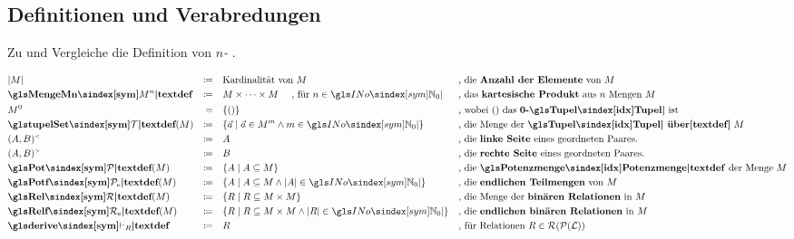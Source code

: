 \subsection{Definitionen und Verabredungen}%
\label{sub:Verabredungen}

Zu \chrqt{\symlen} und \chrqt{\symSet} Vergleiche die Definition von \emph{$n$-\Tupel} .

\begin{align}
	& |M|                          & \defeq \quad & \text{Kardinalität von } M
	&&\text{, die \defn{Anzahl der Elemente} von } M
	\label{def:Anzahl}                \\
	& \definition{\symMengeMn}     & \defeq \quad & M \times \dots \times M \quad \text{ , für } n \in \symINo
	&&\text{, das \defn{kartesische Produkt} aus $n$ Mengen } M
	\label{def:kartesischesProdukt}   \\
	& M^0                          &    \eq \quad & \{()\}
	&&\text{, wobei $()$ das \defn{0-\Tupel} ist}
	\label{def:Mo}                    \\
	& \definition{\symtupelSet}(M) & \defeq \quad & \{ \vec{a} \mid \vec{a} \in M^m \land m \in \symINo \}
	&&\text{, die Menge der \definition{\Tupel\ über} } M
	\label{def:Tupelmenge}            \\
	& \links{(A,B)}                & \defeq \quad & A
	&& \text{, die \defn{linke Seite} eines geordneten Paares.}
	\label{def:links}                 \\
	& \rechts{(A,B)}               & \defeq \quad & B
	&& \text{, die \defn{rechte Seite} eines geordneten Paares.}
	\label{def:rechts}                \\
	& \definition{\symPot}(M)      & \defeq \quad & \{ A \mid A \subseteq M \}
	&&\text{, die \definition{\Potenzmenge} der Menge } M
	\label{def:Potenzmenge}           \\
	& \definition{\symPotf}(M)     & \defeq \quad & \{ A \mid A \subseteq M \land |A| \in \symINo\}
	&& \text{, die \defn{endlichen Teilmengen} von } M
	\label{def:endlichePotenzmenge}   \\
	& \definition{\symRel}(M)      & \defeq \quad & \{ R \mid R \subseteq M \times M\}
	&& \text{, die Menge der \defn{binären Relationen} in } M
	\label{def:Relationsmenge}        \\
	& \definition{\symRelf}(M)     & \defeq \quad & \{ R \mid R \subseteq M \times M \land |R| \in \symINo\}
	&& \text{, die \defn{endlichen binären Relationen} in } M
	\label{def:endlicheRelationsmenge} \\
	& \definition{\symderiveR}     & \defeq \quad & R
	&& \text{, für Relationen } R \in \deriveSetRel
	\label{def:Ableitung}
\end{align}
